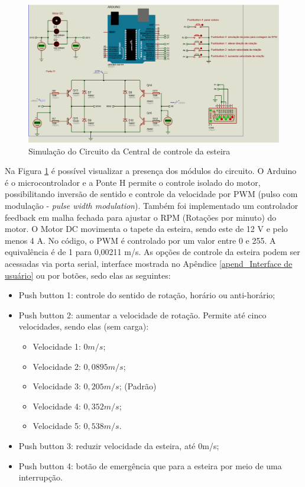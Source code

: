         \begin{figure}[h]
           \centering
           \includegraphics[width=1\textwidth]{imagens/EsquemaDoCirtuitoDaCentralDeControle.png}
           \caption{Simulação do Circuito da Central de controle da esteira}
          \label{fig:EsquemaDoCirtuitoDaCentralDeControle}
        \end{figure}
    
    Na Figura \ref{fig:EsquemaDoCirtuitoDaCentralDeControle} é possível visualizar a presença dos módulos do circuito. O Arduino é o microcontrolador e a Ponte H permite o controle isolado do motor, possibilitando inversão de sentido e controle da velocidade por PWM (pulso com modulação - \textit{pulse width modulation}). Também foi implementado um controlador feedback em malha fechada para ajustar o RPM (Rotações por minuto) do motor.  O Motor DC movimenta o tapete da esteira, sendo este de 12 V e pelo menos 4 A. No código, o PWM é controlado por um valor entre 0 e 255. A equivalência é de 1 para 0,00211 m/s. As opções de controle da esteira podem ser acessadas via porta serial, interface mostrada no Apêndice \ref{apend_Interface de usuário} ou por botões, sedo elas as seguintes:
    
    

\begin{itemize}
    \item Push button 1: controle do sentido de rotação, horário ou anti-horário;
    \item Push button 2: aumentar a velocidade de rotação. Permite até cinco velocidades, sendo elas (sem carga):
    \begin{itemize}
        \item Velocidade 1: $0m/s$; 
        \item Velocidade 2: $0,0895m/s$; 
        \item Velocidade 3: $0,205m/s$; (Padrão)
        \item Velocidade 4: $0,352m/s$;
        \item Velocidade 5: $0,538m/s$.
    \end{itemize}
    \item Push button 3: reduzir velocidade da esteira, até 0m/s;
    \item Push button 4: botão de emergência que para a esteira por meio de uma interrupção.
\end{itemize}

